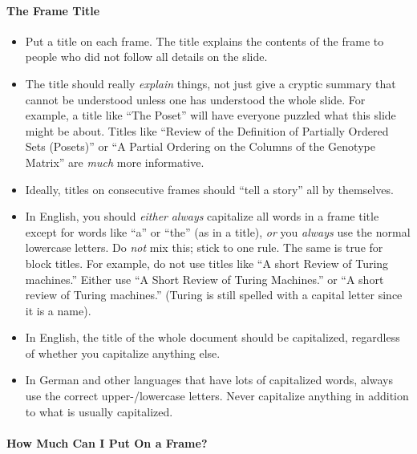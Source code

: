 \paragraph{The Frame Title}

\begin{itemize}
\item
  Put a title on each frame. The title explains the contents of the frame to people who did not follow all details on the slide.
\item
  The title should really \emph{explain} things, not just give a cryptic summary that cannot be understood unless one has understood the whole slide. For example, a title like ``The Poset'' will have everyone puzzled what this slide might be about. Titles like ``Review of the Definition of Partially Ordered Sets (Posets)'' or ``A Partial Ordering on the Columns of the Genotype Matrix'' are \emph{much} more informative.
\item
  Ideally, titles on consecutive frames should ``tell a story'' all by themselves.
\item
  In English, you should \emph{either} \emph{always} capitalize all words in a frame title except for words like ``a'' or ``the'' (as in a title), \emph{or} you \emph{always} use the normal lowercase letters. Do \emph{not} mix this; stick to one rule. The same is true for block titles. For example, do not use titles like ``A short Review of Turing machines.'' Either use ``A Short Review of Turing Machines.'' or ``A short review of Turing machines.'' (Turing is still spelled with a capital letter since it is a name).
\item
  In English, the title of the whole document should be capitalized, regardless of whether you capitalize anything else.
\item
  In German and other languages that have lots of capitalized words, always use the correct upper-/lowercase letters. Never capitalize anything in addition to what is usually capitalized.
\end{itemize}

\paragraph{How Much Can I Put On a Frame?}

